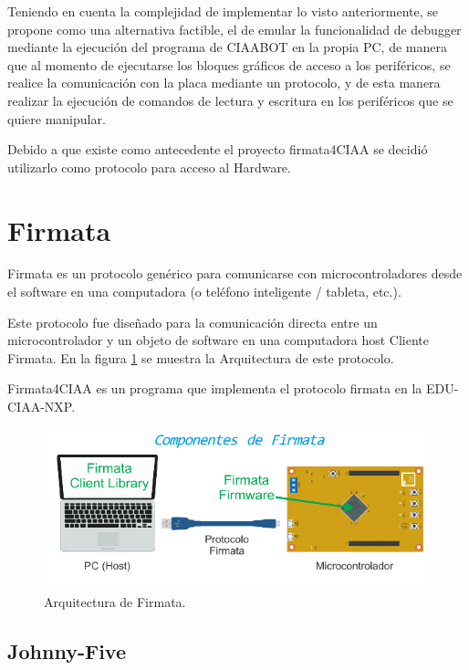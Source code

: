 Teniendo en cuenta la complejidad de implementar lo visto anteriormente, se propone como una alternativa factible, el de emular la funcionalidad de debugger mediante la ejecución del programa de CIAABOT en la propia PC, de manera que al momento de ejecutarse los bloques gráficos de acceso a los periféricos, se realice la comunicación con la placa mediante un protocolo, y de esta manera realizar la ejecución de comandos de lectura y escritura en los periféricos que se quiere manipular.

Debido a que existe como antecedente el proyecto firmata4CIAA se decidió utilizarlo como protocolo para acceso al Hardware.


\section{Firmata}
\label{sec:Firmata}

Firmata es un protocolo genérico para comunicarse con microcontroladores desde
el software en una computadora (o teléfono inteligente / tableta, etc.).

Este protocolo fue diseñado para la comunicación directa entre un microcontrolador y un objeto de software en una computadora host Cliente Firmata. En la figura \ref{fig:componentesFirmata} se muestra la Arquitectura de este protocolo.

Firmata4CIAA es un programa que implementa el protocolo firmata en la EDU-CIAA-NXP.

\begin{figure}[h]
	\centering
	\includegraphics[scale=.80]{./Figures/componentesFirmata.png}
	\caption{Arquitectura de Firmata.}
	\label{fig:componentesFirmata}
\end{figure}

\subsection{Johnny-Five}
\label{subsec:Johnny-Five}

